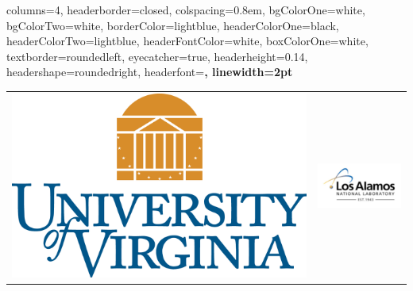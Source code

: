 \documentclass[landscape,paperwidth=70in,paperheight=46in,fontscale=0.225]{baposter} %
\begin{document}
\footnotesize
\begin{poster}
{
columns=4,  %
headerborder=closed, %
colspacing=0.8em, %
bgColorOne=white, %
bgColorTwo=white, %
borderColor=lightblue, %
headerColorOne=black, %
headerColorTwo=lightblue, %
headerFontColor=white, %
boxColorOne=white, %
textborder=roundedleft, %
eyecatcher=true, %
headerheight=0.14\textheight, %
headershape=roundedright, %
headerfont=\Large\bf\textsc, %
linewidth=2pt %
}
%
{ 
\begin{tabular}{c c}
\includegraphics[scale=0.2]{logos/uva_logo.png} & \includegraphics[scale=0.4]{logos/losA.png} \\

\end{tabular}}
\end{poster}
\end{document}
